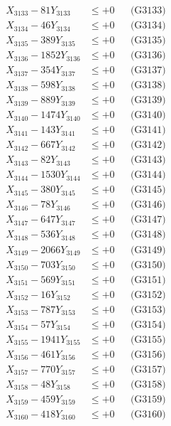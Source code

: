 \documentclass[a4paper,10pt]{article}
\begin{document}
{\begin{align}
X_{3133} - 81Y_{3133} &\leq +0 && \text{(G3133)} \\
X_{3134} - 46Y_{3134} &\leq +0 && \text{(G3134)} \\
X_{3135} - 389Y_{3135} &\leq +0 && \text{(G3135)} \\
X_{3136} - 1852Y_{3136} &\leq +0 && \text{(G3136)} \\
X_{3137} - 354Y_{3137} &\leq +0 && \text{(G3137)} \\
X_{3138} - 598Y_{3138} &\leq +0 && \text{(G3138)} \\
X_{3139} - 889Y_{3139} &\leq +0 && \text{(G3139)} \\
X_{3140} - 1474Y_{3140} &\leq +0 && \text{(G3140)} \\
\allowbreak
X_{3141} - 143Y_{3141} &\leq +0 && \text{(G3141)} \\
X_{3142} - 667Y_{3142} &\leq +0 && \text{(G3142)} \\
X_{3143} - 82Y_{3143} &\leq +0 && \text{(G3143)} \\
X_{3144} - 1530Y_{3144} &\leq +0 && \text{(G3144)} \\
X_{3145} - 380Y_{3145} &\leq +0 && \text{(G3145)} \\
X_{3146} - 78Y_{3146} &\leq +0 && \text{(G3146)} \\
X_{3147} - 647Y_{3147} &\leq +0 && \text{(G3147)} \\
X_{3148} - 536Y_{3148} &\leq +0 && \text{(G3148)} \\
X_{3149} - 2066Y_{3149} &\leq +0 && \text{(G3149)} \\
X_{3150} - 703Y_{3150} &\leq +0 && \text{(G3150)} \\
\allowbreak
X_{3151} - 569Y_{3151} &\leq +0 && \text{(G3151)} \\
X_{3152} - 16Y_{3152} &\leq +0 && \text{(G3152)} \\
X_{3153} - 787Y_{3153} &\leq +0 && \text{(G3153)} \\
X_{3154} - 57Y_{3154} &\leq +0 && \text{(G3154)} \\
X_{3155} - 1941Y_{3155} &\leq +0 && \text{(G3155)} \\
X_{3156} - 461Y_{3156} &\leq +0 && \text{(G3156)} \\
X_{3157} - 770Y_{3157} &\leq +0 && \text{(G3157)} \\
X_{3158} - 48Y_{3158} &\leq +0 && \text{(G3158)} \\
X_{3159} - 459Y_{3159} &\leq +0 && \text{(G3159)} \\
X_{3160} - 418Y_{3160} &\leq +0 && \text{(G3160)} \\

\end{align}}
\end{document}
